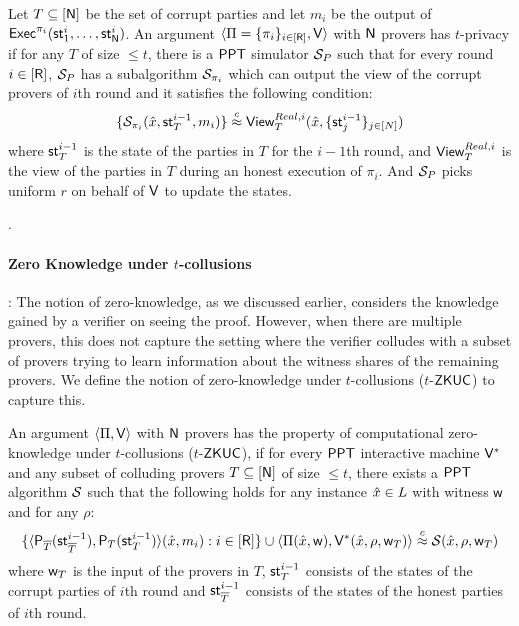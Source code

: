 \begin{definition}
Let $T\subseteq [\mathsf{N}]$ be the set of corrupt parties and let $m_i$ be the output of $\mathsf{Exec}^{\pi_i}(\mathsf{st}^i_1, \ldots, \mathsf{st}^i_{\mathsf{N}})$. An argument $\langle \Pi = \{\pi_i\}_{i \in [\mathsf{R}]},\mathsf{V}\rangle$ with $\mathsf{N}$ provers has $t$-privacy if for any $T$ of size $\leq t$, there is a $\mathsf{PPT}$ simulator $\mathcal{S}_{P}$ such that for every round $i \in [\mathsf{R}]$, $\mathcal{S}_{P}$ has a subalgorithm  $\mathcal{S}_{\pi_i}$ which can output the view of the corrupt provers of  $i$th round and it satisfies the following condition: 
\[
 \{ \mathcal{S}_{\pi_i} (\hat{x}, \mathsf{st}^{i-1}_T, m_i) \} \stackrel{c}{\approx}  \mathsf{View}^{Real, i}_T ( \hat{x}, \{\mathsf{st}^{i-1}_j\}_{j \in [N]}) 
\]
where $\mathsf{st}^{i-1}_T$ is the state of the parties in $T$ for the $i-1$th round, and $\mathsf{View}^{Real, i}_T$ is the view of the parties in $T$ during an honest execution of $\pi_i$.
And $\mathcal{S}_P$ picks uniform $r$ on behalf of $\mathsf{V}$ to update the states.
\end{definition}
.

\paragraph{Zero Knowledge under $t$-collusions}: 
The notion of zero-knowledge, as we discussed earlier, considers the knowledge gained by a verifier on seeing the proof. However, when there are multiple provers, this does not capture the setting where the verifier colludes with a subset of provers trying to learn information about the witness shares of the remaining provers. We define the notion of zero-knowledge under $t$-collusions ($t$-$\mathsf{ZKUC}$) to capture this.

\begin{definition}
An argument $\langle \Pi,\mathsf{V}\rangle$ with $\mathsf{N}$ provers has the property of computational zero-knowledge under $t$-collusions ($t$-$\mathsf{ZKUC}$), if for every $\mathsf{PPT}$ interactive machine $\mathsf{V}^*$ and any subset of colluding provers $T\subseteq [\mathsf{N}]$ of size $\leq t$, there exists a $\mathsf{PPT}$ algorithm $\mathcal{S}$ such that the following holds for any instance $\hat{x} \in L$ with witness $\mathsf{w}$ and for any $\rho$: 
\[
 \{ \langle  \mathsf{P}_{\overline{T}}( \mathsf{st}^{i-1}_{\overline{T}} ) , \mathsf{P}_T ( \mathsf{st}^{i-1}_T ) \rangle ( \hat{x}  , m_i): i\in [\mathsf{R}] \} \cup \langle \Pi(\hat{x}, \mathsf{w}),\mathsf{V}^*(\hat{x}, \rho, \mathsf{w}_T)\rangle  \stackrel{c}{\approx}  \mathcal{S} (\hat{x}, \rho, \mathsf{w}_T)
\]
where $\mathsf{w}_T$ is the input of the provers in $T$, $\mathsf{st}^{i-1}_T$ consists of the states of the corrupt parties of $i$th round and $\mathsf{st}^{i-1}_{\overline{T}}$ consists of the states of the honest parties of $i$th round. 
\end{definition}

